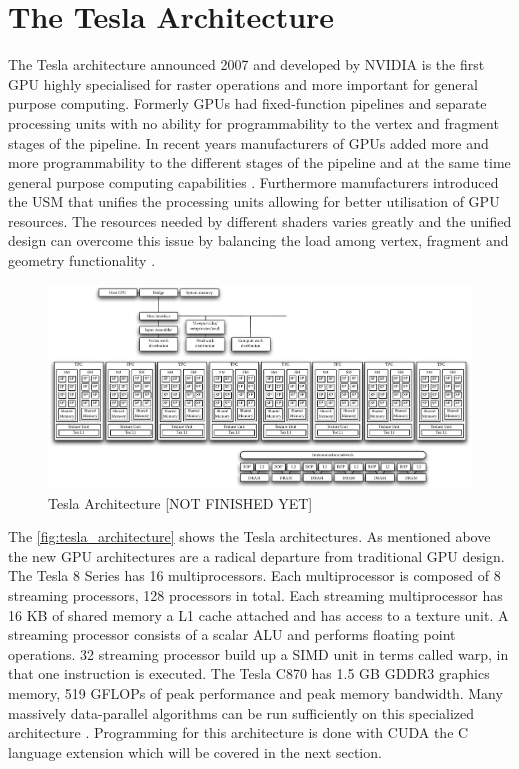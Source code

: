 \section{The Tesla Architecture}%
\label{sub:the_tesla_architecture} 
The Tesla architecture announced 2007 and developed by \gls{NVIDIA} is the first
\gls{GPU} highly specialised for raster operations and more important
for general purpose computing. Formerly \glspl{GPU} had fixed-function
pipelines and separate processing units with no ability for programmability to
the vertex and fragment stages of the pipeline. In recent years manufacturers of
\glspl{GPU} added more and more programmability to the different stages
of the pipeline and at the same time general purpose computing capabilities
\citep{citeulike:3844545}. Furthermore manufacturers introduced the  \gls{USM} 
that unifies the processing units allowing for better
utilisation of  \gls{GPU} resources. The resources needed by different
shaders varies greatly and the unified design can overcome this issue by
balancing the load among vertex, fragment and geometry functionality
\citep{citeulike:3145468}.

\begin{figure}[ht]
\centering
\includegraphics[width=\textwidth]{gfx/tesla_architecture} 
\caption{Tesla Architecture [NOT FINISHED YET]} 
\label{fig:tesla_architecture} 
\end{figure} 

The \autoref{fig:tesla_architecture} shows the Tesla architectures. As mentioned
above the new \gls{GPU} architectures are a radical departure from traditional
\gls{GPU} design. The Tesla 8 Series has 16 multiprocessors. Each multiprocessor
is composed of 8 streaming processors, 128 processors in total. Each streaming
multiprocessor has 16 \gls{KB} of shared memory a L1 cache attached and has access
to a texture unit. A streaming processor consists of a scalar \gls{ALU} and
performs floating point operations. 32 streaming processor build up a \gls{SIMD}
unit in {} terms called warp, in that one instruction is executed. The Tesla
C870 has 1.5 \gls{GB} \gls{GDDR3} graphics memory, 519 \glspl{GFLOP} of peak
performance and  peak memory bandwidth. Many massively
data-parallel algorithms can be run sufficiently on this specialized
architecture \citep{citeulike:3145468}. Programming for this architecture is
done with \gls{CUDA} the C language extension which will be covered in the next
section.


